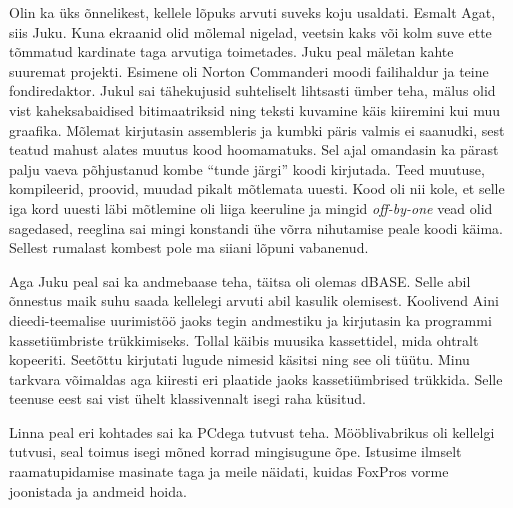 Olin ka üks õnnelikest, kellele lõpuks arvuti suveks koju usaldati. Esmalt 
Agat, siis Juku. Kuna ekraanid olid mõlemal nigelad, veetsin kaks või kolm suve 
ette tõmmatud kardinate taga arvutiga toimetades. Juku peal mäletan kahte 
suuremat projekti. Esimene oli Norton Commanderi moodi failihaldur ja teine 
fondiredaktor. Jukul sai tähekujusid suhteliselt lihtsasti ümber teha, mälus 
olid vist kaheksabaidised bitimaatriksid ning teksti kuvamine käis kiiremini 
kui muu graafika. Mõlemat kirjutasin assembleris ja kumbki päris valmis ei 
saanudki, sest teatud mahust alates muutus kood hoomamatuks. Sel ajal omandasin 
ka pärast palju vaeva põhjustanud kombe \enquote{tunde järgi} koodi kirjutada. 
Teed muutuse, kompileerid, proovid, muudad pikalt mõtlemata uuesti. Kood oli 
nii kole, et selle iga kord uuesti läbi mõtlemine oli liiga keeruline ja mingid 
\emph{off-by-one} vead olid sagedased, reeglina sai mingi konstandi ühe võrra 
nihutamise peale koodi käima. Sellest rumalast kombest pole ma siiani lõpuni 
vabanenud. 

Aga Juku peal sai ka andmebaase teha, täitsa oli olemas dBASE. 
Selle abil õnnestus maik suhu saada kellelegi arvuti abil kasulik olemisest. 
Koolivend Aini dieedi-teemalise uurimistöö jaoks tegin andmestiku ja kirjutasin 
ka programmi kassetiümbriste trükkimiseks. Tollal käibis muusika kassettidel, 
mida ohtralt kopeeriti. Seetõttu kirjutati lugude 
nimesid käsitsi ning see oli tüütu. Minu tarkvara võimaldas aga kiiresti eri 
plaatide jaoks kassetiümbrised trükkida. Selle teenuse eest sai vist ühelt 
klassivennalt isegi raha küsitud.

Linna peal eri kohtades sai ka PCdega tutvust teha. Mööblivabrikus oli kellelgi 
tutvusi, seal toimus isegi mõned korrad mingisugune õpe. Istusime ilmselt 
raamatupidamise masinate taga ja meile näidati, kuidas FoxPros 
vorme joonistada ja andmeid hoida. 

